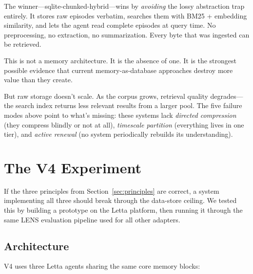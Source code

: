\documentclass[11pt,letterpaper]{article}
\begin{document}
The winner---sqlite-chunked-hybrid---wins by \emph{avoiding} the lossy abstraction trap entirely. It stores raw episodes verbatim, searches them with BM25 + embedding similarity, and lets the agent read complete episodes at query time. No preprocessing, no extraction, no summarization. Every byte that was ingested can be retrieved.

This is not a memory architecture. It is the absence of one. It is the strongest possible evidence that current memory-as-database approaches destroy more value than they create.

But raw storage doesn't scale. As the corpus grows, retrieval quality degrades---the search index returns less relevant results from a larger pool. The five failure modes above point to what's missing: these systems lack \emph{directed compression} (they compress blindly or not at all), \emph{timescale partition} (everything lives in one tier), and \emph{active renewal} (no system periodically rebuilds its understanding).

\section{The V4 Experiment}
\label{sec:v4}

If the three principles from Section~\ref{sec:principles} are correct, a system implementing all three should break through the data-store ceiling. We tested this by building a prototype on the Letta platform, then running it through the same LENS evaluation pipeline used for all other adapters.

\subsection{Architecture}

V4 uses three Letta agents sharing the same core memory blocks:
\end{document}

